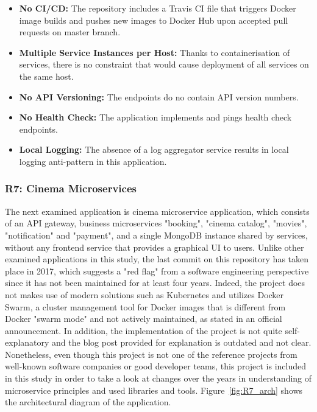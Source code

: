 \documentclass{Configuration_Files/PoliMi3i_thesis}
\begin{document}
\begin{itemize}
    \item \textbf{No CI/CD:} The repository includes a Travis CI file that triggers Docker image builds and pushes new images to Docker Hub upon accepted pull requests on master branch.
    
    \item \textbf{Multiple Service Instances per Host:} Thanks to containerisation of services, there is no constraint that would cause deployment of all services on the same host.
    
    \item \textbf{No API Versioning:} The endpoints do no contain API version numbers.
    
    \item \textbf{No Health Check:} The application implements and pings health check endpoints.
    
    \item \textbf{Local Logging:} The absence of a log aggregator service results in local logging anti-pattern in this application.
\end{itemize}

\subsubsection{R7: Cinema Microservices}
\label{subsubsec:R7}

The next examined application is cinema microservice application, which consists of an API gateway, business microservices "booking", "cinema catalog", "movies", "notification" and "payment", and a single MongoDB instance shared by services, without any frontend service that provides a graphical UI to users.
Unlike other examined applications in this study, the last commit on this repository has taken place in 2017, which suggests a "red flag" from a software engineering perspective since it has not been maintained for at least four years.
Indeed, the project does not makes use of modern solutions such as Kubernetes and utilizes Docker Swarm, a cluster management tool for Docker images that is different from Docker "swarm mode" and not actively maintained, as stated in an official announcement\footnotemark[100].
In addition, the implementation of the project is not quite self-explanatory and the blog post provided for explanation is outdated and not clear.
Nonetheless, even though this project is not one of the reference projects from well-known software companies or good developer teams, this project is included in this study in order to take a look at changes over the years in understanding of microservice principles and used libraries and tools.
Figure~\ref{fig:R7_arch} shows the architectural diagram of the application.
\end{document}
